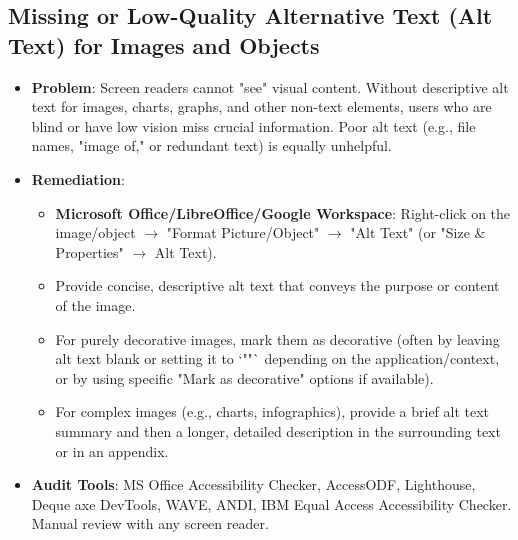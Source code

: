 \subsection{Missing or Low-Quality Alternative Text (Alt Text) for Images and Objects}
\begin{itemize}
    \item \textbf{Problem}: Screen readers cannot "see" visual content. Without descriptive alt text for images, charts, graphs, and other non-text elements, users who are blind or have low vision miss crucial information. Poor alt text (e.g., file names, "image of," or redundant text) is equally unhelpful.
    \item \textbf{Remediation}:
        \begin{itemize}
            \item \textbf{Microsoft Office/LibreOffice/Google Workspace}: Right-click on the image/object $\rightarrow$ "Format Picture/Object" $\rightarrow$ "Alt Text" (or "Size & Properties" $\rightarrow$ Alt Text).
            \item Provide concise, descriptive alt text that conveys the purpose or content of the image.
            \item For purely decorative images, mark them as decorative (often by leaving alt text blank or setting it to `""` depending on the application/context, or by using specific "Mark as decorative" options if available).
            \item For complex images (e.g., charts, infographics), provide a brief alt text summary and then a longer, detailed description in the surrounding text or in an appendix.
        \end{itemize}
    \item \textbf{Audit Tools}: MS Office Accessibility Checker, AccessODF, Lighthouse, Deque axe DevTools, WAVE, ANDI, IBM Equal Access Accessibility Checker. Manual review with any screen reader.
\end{itemize}

